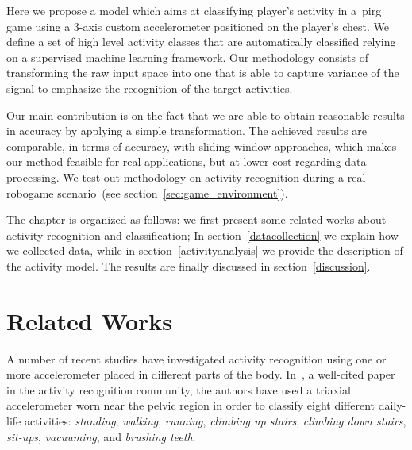 Here we propose a model which aims at classifying player's activity in a~\gls{pirg} game using a 3-axis custom accelerometer positioned on the player's chest. We define a set of high level activity classes that are automatically classified relying on a supervised machine learning framework. Our methodology consists of transforming the raw input space into one that is able to capture variance of the signal to emphasize the recognition of the target activities. 

Our main contribution is on the fact that we are able to obtain reasonable results in accuracy by applying a simple transformation. The achieved results are comparable, in terms of accuracy, with sliding window approaches, which makes our method feasible for real applications, but at lower cost regarding data processing. We test out methodology on activity recognition during a real robogame scenario~(see section~\ref{sec:game_environment}). 

The chapter is organized as follows: we first present some related works about activity recognition and classification; In section~\ref{datacollection} we explain how we collected data, while in section~\ref{activityanalysis} we provide the description of the activity model. The results are finally discussed in section~\ref{discussion}.

\section{Related Works}\label{relatedworks}

A number of recent studies have investigated activity recognition using one or more accelerometer placed in different parts of the body. In~\cite{ravi_activity_2005}, a well-cited paper in the activity recognition community, the authors have used a triaxial accelerometer worn near the pelvic region in order to classify eight different daily-life activities: \textit{standing}, \textit{walking}, \textit{running}, \textit{climbing up stairs}, \textit{climbing down stairs}, \textit{sit-ups}, \textit{vacuuming}, and \textit{brushing teeth}.


